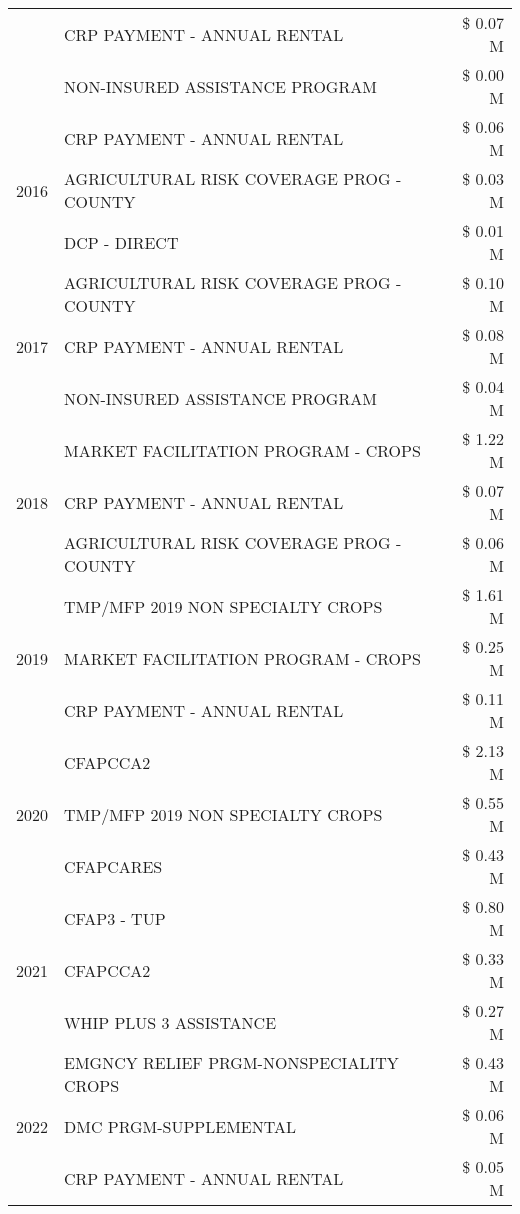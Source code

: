 \begin{tabular}{llr}
 & CRP PAYMENT - ANNUAL RENTAL & \$ 0.07 M \\
 & NON-INSURED ASSISTANCE PROGRAM & \$ 0.00 M \\
\cline{1-3}
\multirow[t]{3}{*}{2016} & CRP PAYMENT - ANNUAL RENTAL & \$ 0.06 M \\
 & AGRICULTURAL RISK COVERAGE PROG - COUNTY & \$ 0.03 M \\
 & DCP - DIRECT & \$ 0.01 M \\
\cline{1-3}
\multirow[t]{3}{*}{2017} & AGRICULTURAL RISK COVERAGE PROG - COUNTY & \$ 0.10 M \\
 & CRP PAYMENT - ANNUAL RENTAL & \$ 0.08 M \\
 & NON-INSURED ASSISTANCE PROGRAM & \$ 0.04 M \\
\cline{1-3}
\multirow[t]{3}{*}{2018} & MARKET FACILITATION PROGRAM - CROPS & \$ 1.22 M \\
 & CRP PAYMENT - ANNUAL RENTAL & \$ 0.07 M \\
 & AGRICULTURAL RISK COVERAGE PROG - COUNTY & \$ 0.06 M \\
\cline{1-3}
\multirow[t]{3}{*}{2019} & TMP/MFP 2019 NON SPECIALTY CROPS & \$ 1.61 M \\
 & MARKET FACILITATION PROGRAM - CROPS & \$ 0.25 M \\
 & CRP PAYMENT - ANNUAL RENTAL & \$ 0.11 M \\
\cline{1-3}
\multirow[t]{3}{*}{2020} & CFAPCCA2 & \$ 2.13 M \\
 & TMP/MFP 2019 NON SPECIALTY CROPS & \$ 0.55 M \\
 & CFAPCARES & \$ 0.43 M \\
\cline{1-3}
\multirow[t]{3}{*}{2021} & CFAP3 - TUP & \$ 0.80 M \\
 & CFAPCCA2 & \$ 0.33 M \\
 & WHIP PLUS 3 ASSISTANCE & \$ 0.27 M \\
\cline{1-3}
\multirow[t]{3}{*}{2022} & EMGNCY RELIEF PRGM-NONSPECIALITY CROPS & \$ 0.43 M \\
 & DMC PRGM-SUPPLEMENTAL & \$ 0.06 M \\
 & CRP PAYMENT - ANNUAL RENTAL & \$ 0.05 M \\
\cline{1-3}
\bottomrule
\end{tabular}
